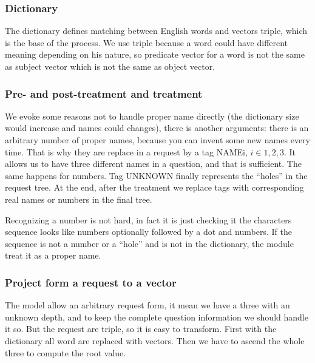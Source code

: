 

\subsubsection{Dictionary}

The dictionary defines matching between English words and vectors triple, which is the base of the process. We use triple because a word could have different meaning depending on his nature, so predicate vector for a word is not the same as subject vector which is not the same as object vector.

\subsubsection{Pre- and post-treatment and treatment}

We evoke some reasons not to handle proper name directly (the dictionary size would increase and names could changes), there is another arguments: there is an arbitrary number of proper names, because you can invent some new names every time. That is why they are replace in a request by a tag NAMEi, $i\in{1,2,3}$. It allows us to have three different names in a question, and that is sufficient. The same happens for numbers. Tag UNKNOWN finally represents the ``holes'' in the request tree. At the end, after the treatment we replace tags with corresponding real names or numbers in the final tree.

Recognizing a number is not hard, in fact it is just checking it the characters sequence looks like numbers optionally followed by a dot and numbers. If the sequence is not a number or a ``hole'' and is not in the dictionary, the module treat it as a proper name.

\subsubsection{Project form a request to a vector}

The model allow an arbitrary request form, it mean we have a three with an unknown depth, and to keep the complete question information we should handle it so. But the request are triple, so it is easy to transform. First with the dictionary all word are replaced with vectors. Then we have to ascend the whole three to compute the root value.

